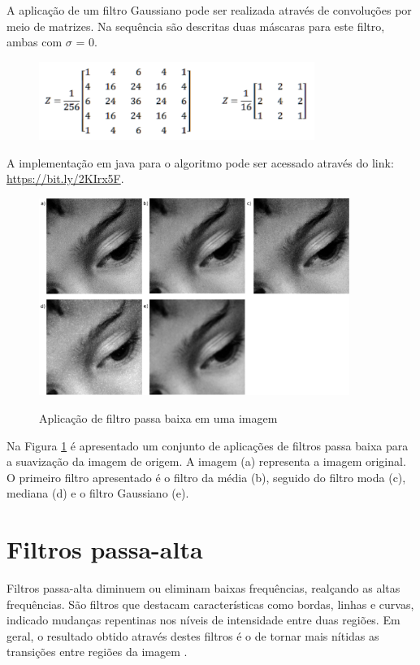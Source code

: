 \documentclass[
	12pt,				%
	oneside,			%
	a4paper,			%
	english,			%
	french,				%
	spanish,			%
	brazil,				%
	]{abntex2}
\begin{document}
A aplicação de um filtro Gaussiano pode ser realizada através de convoluções por meio de matrizes. Na sequência são descritas duas máscaras para este filtro, ambas com \(\sigma\) = 0.

\begin{figure}[ht]
\centering
\includegraphics[width=0.8\textwidth]{imagens/gauss_mascara.png}
\end{figure}


A implementação em java para o algoritmo pode ser acessado através do link: \url{https://bit.ly/2KIrx5F}.


\begin{figure}[h]
\centering
\caption{Aplicação de filtro passa baixa em uma imagem}
\includegraphics[width=0.9\textwidth]{imagens/suavizacao.png}
\sourceAuthor
\label{fig:suavizacao}
\end{figure}

Na Figura \ref{fig:suavizacao} é apresentado um conjunto de aplicações de filtros passa baixa para a suavização da imagem de origem. A imagem (a) representa a imagem original.  O primeiro filtro apresentado é o filtro da média (b), seguido do filtro moda (c), mediana (d) e o filtro Gaussiano (e).

\section{Filtros passa-alta}
\label{sec:passaAlta}

Filtros passa-alta diminuem ou eliminam baixas frequências, realçando as altas frequências. São filtros que destacam características como bordas, linhas e curvas, indicado mudanças repentinas nos níveis de intensidade entre duas regiões. Em geral, o resultado obtido através destes filtros é o de tornar mais nítidas as transições entre regiões da imagem \cite{conciAzevedoLeta:2008}.
\end{document}

